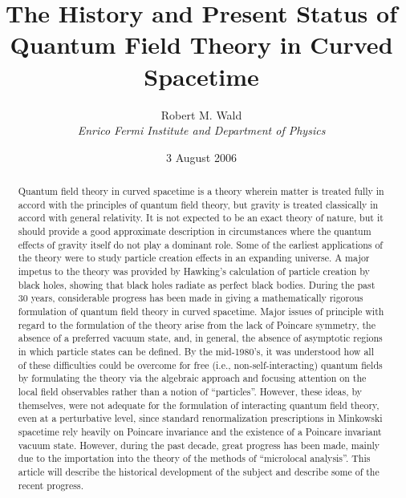 \documentclass[12pt,epsf,amsfonts,amssymb]{article}
\begin{document}
 

\title{\large The History and Present Status of Quantum Field Theory in Curved
Spacetime}  

\author{\large Robert M. Wald \\ 
 {\normalsize\it Enrico Fermi Institute and Department of Physics}%
        } %

\date{\normalsize 3 August 2006}

\maketitle

\linespread{1}

\begin{abstract}

Quantum field theory in curved spacetime is a theory wherein matter is
treated fully in accord with the principles of quantum field theory,
but gravity is treated classically in accord with general
relativity. It is not expected to be an exact theory of nature, but it
should provide a good approximate description in circumstances where
the quantum effects of gravity itself do not play a dominant role.
Some of the earliest applications of the theory were to
study particle creation effects in an expanding universe. A major
impetus to the theory was provided by Hawking's calculation of
particle creation by black holes, showing that black holes radiate as
perfect black bodies. During the past 30 years, considerable progress
has been made in giving a mathematically rigorous formulation of
quantum field theory in curved spacetime. Major issues of principle
with regard to the formulation of the theory arise from the lack of
Poincare symmetry, the absence of a preferred vacuum state, and, in
general, the absence of asymptotic regions in which particle states
can be defined. By the mid-1980's, it was understood how all of these
difficulties could be overcome for free (i.e., non-self-interacting)
quantum fields by formulating the theory via the algebraic approach
and focusing attention on the local field observables rather than a notion
of ``particles''. However, these
ideas, by themselves, were not adequate for the formulation of
interacting quantum field theory, even at a perturbative level, since
standard renormalization prescriptions in Minkowski spacetime rely
heavily on Poincare invariance and the existence of a Poincare
invariant vacuum state. However, during the past decade, great
progress has been made, mainly due to the importation into the theory
of the methods of ``microlocal analysis''. This article will describe
the historical development of the subject and describe some of the
recent progress.

\end{abstract} 
\end{document}
